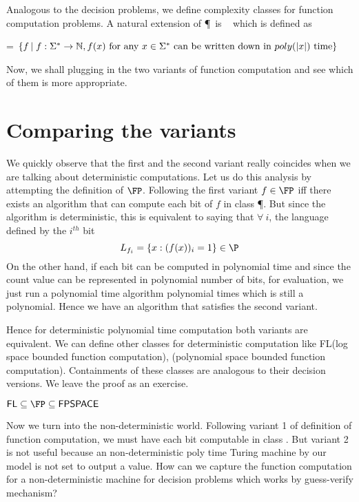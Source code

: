 Analogous to the decision problems, we define complexity classes for function
computation problems. A natural extension of \P~is \FP~ which is defined as
\begin{center}
\FP = $\{f \left | \right . f:\Sigma^* \to {\mathbb{N}}, f(x) \text{ for any } x \in
\Sigma^* \text{ can be written down in } poly(|x|) \text{ time}\}$
\end{center}

Now, we shall plugging in the two variants of function computation and see
which of them is more appropriate.

\section{Comparing the variants}
We quickly observe that the first and the second variant really coincides when we are talking
about deterministic computations. Let us do this analysis by attempting the definition of $\FP$.
Following the first variant $f \in \FP$ iff there exists an algorithm that can
compute each bit of $f$ in class \P. But since the algorithm is deterministic, this is  
equivalent to saying that $\forall~i$, the language defined by the $i^{th}$ bit 
$$L_{f_i} = \{ x : (f(x))_i = 1 \} \in \P$$
On the other hand, if each bit can be computed in polynomial time 
and since the count value can be represented in polynomial number of bits, for
evaluation, we just run a polynomial time algorithm polynomial times
which is still a polynomial. Hence we have an algorithm that satisfies the 
second variant.

Hence for deterministic polynomial time computation both variants are equivalent.
We can define other classes for deterministic computation 
like {\sf FL}(log space bounded function computation), \FPSPACE(polynomial
space bounded function computation). Containments of these classes are
analogous to their decision versions. We leave the proof as an exercise.

\begin{lemma}
${\sf FL} \subseteq \FP \subseteq \FPSPACE$
\end{lemma}

Now we turn into the non-deterministic world. 
Following variant 1 of definition of function computation, we must have each
bit computable in class \NP. But variant 2 is not useful because an non-deterministic 
poly time Turing machine by our model is not set to output a value. How can we
capture the function computation for a non-deterministic machine for decision
problems which works by guess-verify mechanism?

